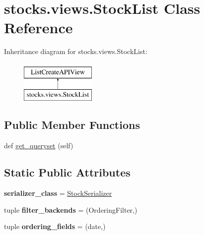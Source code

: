 \hypertarget{classstocks_1_1views_1_1_stock_list}{}\section{stocks.\+views.\+Stock\+List Class Reference}
\label{classstocks_1_1views_1_1_stock_list}
Inheritance diagram for stocks.\+views.\+Stock\+List\+:\begin{figure}[H]
\begin{center}
\leavevmode
\includegraphics[height=2.000000cm]{classstocks_1_1views_1_1_stock_list}
\end{center}
\end{figure}
\subsection*{Public Member Functions}
\begin{DoxyCompactItemize}
\item 
def \mbox{\hyperlink{classstocks_1_1views_1_1_stock_list_a59e9ccb2be0430bbeef05167009e40c3}{get\+\_\+queryset}} (self)
\end{DoxyCompactItemize}
\subsection*{Static Public Attributes}
\begin{DoxyCompactItemize}
\item 
\mbox{\label{classstocks_1_1views_1_1_stock_list_ab607663b56d4ef0e78f97b695b369726}} 
{\bfseries serializer\+\_\+class} = \mbox{\hyperlink{classstocks_1_1serializers_1_1_stock_serializer}{Stock\+Serializer}}
\item 
\mbox{\label{classstocks_1_1views_1_1_stock_list_a5760e75d23a65adac016fa30b93af9e4}} 
tuple {\bfseries filter\+\_\+backends} = (Ordering\+Filter,)
\item 
\mbox{\label{classstocks_1_1views_1_1_stock_list_a89797d122ada805421dcf12b2b4b680f}} 
tuple {\bfseries ordering\+\_\+fields} = (\textquotesingle{}date\textquotesingle{},)
\end{DoxyCompactItemize}


